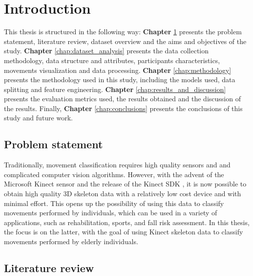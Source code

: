 %
%
\hypersetup{colorlinks=true, linkcolor=blue, citecolor=red}
\chapter{Introduction} \label{chap:introduction}

    This thesis is structured in the following way: \textbf{Chapter} \ref{chap:introduction} presents the problem statement, literature review, dataset overview and the aims and objectives of the study. \textbf{Chapter} \ref{chap:dataset_analysis} presents the data collection methodology, data structure and attributes, participants characteristics, movements visualization and data processing. \textbf{Chapter} \ref{chap:methodology} presents the methodology used in this study, including the models used, data splitting and feature engineering. \textbf{Chapter} \ref{chap:results_and_discussion} presents the evaluation metrics used, the results obtained and the discussion of the results. Finally, \textbf{Chapter} \ref{chap:conclusions} presents the conclusions of this study and future work.

   \section{Problem statement}

      Traditionally, movement classification requires high quality sensors and and complicated computer vision algorithms. However, with the advent of the Microsoft Kinect sensor and the release of the Kinect SDK \cite{jana_kinect_2012}, it is now possible to obtain high quality 3D skeleton data with a relatively low cost device and with minimal effort. This opens up the possibility of using this data to classify movements performed by individuals, which can be used in a variety of applications, such as rehabilitation, sports, and fall risk assessment. In this thesis, the focus is on the latter, with the goal of using Kinect skeleton data to classify movements performed by elderly individuals.
  
   \section{Literature review}

